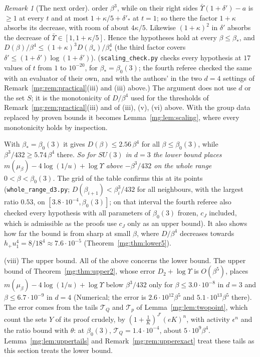 \documentclass[11pt,a4paper]{article}
\theoremstyle{definition}
\theoremstyle{remark}
\newtheorem{remark}[theorem]{Remark}
\begin{document}
\begin{remark}[The next order]
order $\beta^3$, while on their right sides $\bar\Upsilon(1+\delta')-a$ is $\ge1$ at every $t$ and at most $1+\kappa/5+\delta'_*$ at $t=1$; so there the factor $1+\kappa$ absorbs its decrease, with room
of about $4\kappa/5$. Likewise $(1+\kappa)^2$ in $\delta'$ absorbs the decrease of $\bar\Upsilon\in[1,1+\kappa/5]$. Hence the hypotheses hold at
every $\beta\le\beta_*$, and $D(\beta)/\beta^4\le(1+\kappa)^3D(\beta_*)/\beta_*^4$ (the third factor covers $\delta'\le(1+\delta')\log(1+\delta')$). (\texttt{scaling\_check.py} checks every hypothesis at $17$ values of $t$ from $1$ to $10^{-20}$, for
$\beta_*=\beta_0(3)$; the fourth referee checked the same with an evaluator of their own, and with the authors' in the two $d=4$ settings of Remark~\ref{mg:rem:practical}(iii) and (iii)
above.) The argument does not use $d$ or the set $S$; it is the monotonicity of $D/\beta^4$ used for the thresholds of Remark~\ref{mg:rem:practical}(iii) and of (iii), (v), (vi) above. With the group
data replaced by proven bounds it becomes Lemma~\ref{mg:lem:scaling}, where every monotonicity holds by inspection.

With $\beta_*=\beta_0(3)$ it gives $D(\beta)\le2.56\,\beta^4$ for all $\beta\le\beta_0(3)$, while $\beta^3/432\ge5.74\,\beta^4$ there. \emph{So for $SU(3)$ in $d=3$ the lower bound places
$m(\mu_\beta)-4\log(1/u)+\log\Upsilon$ above $-\beta^3/432$ on the whole range $0<\beta<\beta_0(3)$.} The grid of the table confirms this at its points
(\texttt{whole\_range\_d3.py}; $D(\beta_{i+1})<\beta_i^3/432$ for all neighbours, with the largest ratio $0.53$, on $[3.8\cdot10^{-4},\beta_0(3)]$; on that interval the fourth referee also checked every
hypothesis with all parameters of $\beta_0(3)$ frozen, $c_J$ included, which is admissible as the proofs use $c_J$ only as an upper bound). It also shows how far the bound is from sharp at small $\beta$, where $D/\beta^4$ decreases towards $h_+u_1^4=8/18^4\approx7.6\cdot10^{-5}$
(Theorem~\ref{mg:thm:lower5}).

(viii) The upper bound. All of the above concerns the lower bound. The upper bound of Theorem~\ref{mg:thm:upper2}, whose error $D_2+\log\Upsilon$ is $O(\beta^5)$, places
$m(\mu_\beta)-4\log(1/u)+\log\Upsilon$ below $\beta^3/432$ only for $\beta\le3.0\cdot10^{-8}$ in $d=3$ and $\beta\le6.7\cdot10^{-9}$ in $d=4$ (Numerical; the error is $2.6\cdot10^{12}\beta^5$ and
$5.1\cdot10^{13}\beta^5$ there). The error comes from the tails $\mathcal T_Q$ and $\mathcal T_p$ of Lemma~\ref{mg:lem:twopoint}, which count the sets $Y$ of its proof crudely,
by $(1+\frac1K)^{J'}(eK)^n$, with activity $\epsilon^n$ and the ratio bound with $\theta$: at $\beta_0(3)$, $\mathcal T_Q=1.4\cdot10^{-4}$, about $5\cdot10^9\beta^4$. Lemma~\ref{mg:lem:uppertails} and
Remark~\ref{mg:rem:upperexact} treat these tails as this section treats the lower bound.


\end{remark}
\end{document}
